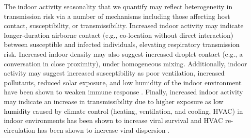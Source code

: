 \documentclass{article}
\begin{document}
The indoor activity seasonality that we quantify may reflect heterogeneity in transmission risk via a number of mechanisms including those affecting host contact, susceptibility, or transmissibility. %
Increased indoor activity may indicate longer-duration airborne contact (e.g., co-location without direct interaction) between susceptible and infected individuals, elevating respiratory transmission risk. Increased indoor density may also suggest increased droplet contact (e.g., a conversation in close proximity), under homogeneous mixing. Additionally, indoor activity may suggest increased susceptibility as poor ventilation, increased pollutants, reduced solar exposure, and low humidity of the indoor environment have been shown to weaken immune response \cite{moriyama2020seasonality}. Finally, increased indoor activity may indicate an increase in transmissibility due to higher exposure as low humidity caused by climate control (heating, ventilation, and cooling, HVAC) in indoor environments has been shown to increase viral survival and HVAC re-circulation has been shown to increase viral dispersion \cite{lu2020covid, liao2005probabilistic}.
\end{document}
